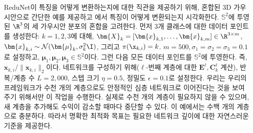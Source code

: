 \documentclass[../../book-main_ko.tex]{subfiles}
\begin{document}
\begin{example}
ReduNet이 특징을 어떻게 변환하는지에 대한 직관을 제공하기 위해, 혼합된 3D 가우시안으로 간단한 예를 제공하고 에서 특징이 어떻게 변환되는지 시각화한다. 
$\mathbb{S}^2$에 투영된 $\R^{3}$의 세 가우시안 분포의 혼합을 고려한다. 먼저 3개 클래스에 대한 데이터 포인트를 생성한다: $k=1,2,3$에 대해, $\bm{X}_{k}=[\bm{x}_{k,1}, \ldots, \bm{x}_{k,m}] \in \R^{3\times m}$, $\bm{x}_{k,i} \sim \mathcal{N}(\bm{\mu}_{k}, \sigma_{k}^{2} \I)$, 그리고 ${\pi}(\x_{k,i}) = k$.
$m=500, \sigma_{1}=\sigma_{2}=\sigma_{3}=0.1$로 설정하고, $\bm{\mu}_{1}, \bm{\mu}_{2}, \bm{\mu}_{3} \in \mathbb{S}^2$이다. 
그런 다음 모든 데이터 포인트를 $\mathbb{S}^{2}$에 투영한다. 즉, $\bm{x}_{k,i}/\|\bm{x}_{k,i}\|_{2}$이다. 
네트워크를 구성하기 위해($\ell$-번째 계층에 대한 $\bm{E}^{\ell}, \bm{C}^{\ell}_{k}$ 계산), 반복/계층 수 $L=2,000$, 스텝 크기 $\eta=0.5$, 정밀도 $\epsilon=0.1$로 설정한다. 
우리는 우리의 프레임워크가 수천 개의 계층으로도 안정적인 심층 네트워크로 이어진다는 것을 보여주기 위해서만 이 작업을 수행한다. 
실제로 수천 개의 계층이 필요하지 않을 수 있으며, 새 계층을 추가해도 수익이 감소할 때마다 중단할 수 있다. 
이 예에서는 수백 개의 계층으로 충분하다. 따라서 명확한 최적화 목표는 필요한 네트워크 깊이에 대한 자연스러운 기준을 제공한다.


\end{example}
\end{document}
